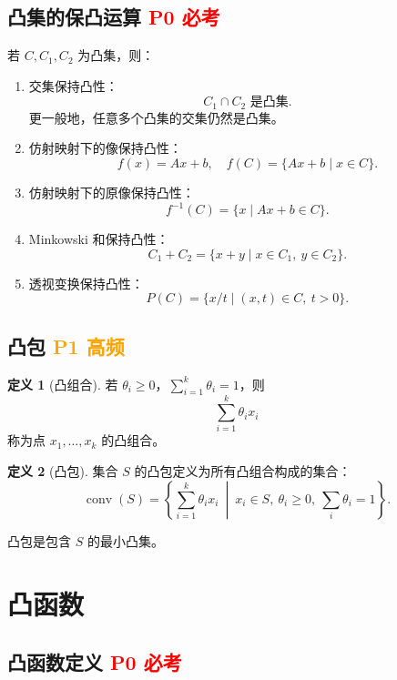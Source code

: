 \documentclass[11pt,a4paper]{ctexart}
\newcommand{\Pzero}{\textcolor{red}{\textbf{P0 必考}}}
\newcommand{\Pone}{\textcolor{orange}{\textbf{P1 高频}}}
\theoremstyle{definition}
\newtheorem{definition}{定义}[section]
\theoremstyle{plain}
\theoremstyle{remark}
\begin{document}
\subsection{凸集的保凸运算 \Pzero}

若 $C,C_1,C_2$ 为凸集，则：

\begin{enumerate}
    \item 交集保持凸性：
    \[
        C_1 \cap C_2 \text{ 是凸集}.
    \]
    更一般地，任意多个凸集的交集仍然是凸集。

    \item 仿射映射下的像保持凸性：
    \[
        f(x)=Ax+b,\quad f(C)=\{Ax+b \mid x\in C\}.
    \]

    \item 仿射映射下的原像保持凸性：
    \[
        f^{-1}(C)=\{x \mid Ax+b \in C\}.
    \]

    \item Minkowski 和保持凸性：
    \[
        C_1+C_2=\{x+y\mid x\in C_1,\ y\in C_2\}.
    \]

    \item 透视变换保持凸性：
    \[
        P(C)=\{x/t \mid (x,t)\in C,\ t>0\}.
    \]
\end{enumerate}

\subsection{凸包 \Pone}

\begin{definition}[凸组合]
若 $\theta_i\ge 0$，$\sum_{i=1}^k \theta_i=1$，则
\[
    \sum_{i=1}^k \theta_i x_i
\]
称为点 $x_1,\dots,x_k$ 的凸组合。
\end{definition}

\begin{definition}[凸包]
集合 $S$ 的凸包定义为所有凸组合构成的集合：
\[
    \operatorname{conv}(S)
    =
    \left\{
    \sum_{i=1}^k \theta_i x_i
    \ \middle|\
    x_i\in S,\ \theta_i\ge 0,\ \sum_i \theta_i=1
    \right\}.
\]
\end{definition}

凸包是包含 $S$ 的最小凸集。

\section{凸函数}

\subsection{凸函数定义 \Pzero}
\end{document}
